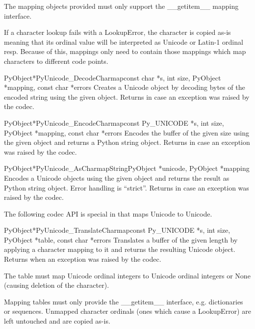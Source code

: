 \documentclass{manual}
\begin{document}
The mapping objects provided must only support the __getitem__ mapping
interface.

If a character lookup fails with a LookupError, the character is
copied as-is meaning that its ordinal value will be interpreted as
Unicode or Latin-1 ordinal resp. Because of this, mappings only need
to contain those mappings which map characters to different code
points.

\begin{cfuncdesc}{PyObject*}{PyUnicode_DecodeCharmap}{const char *s,
                                               int size,
                                               PyObject *mapping,
                                               const char *errors}
Creates a Unicode object by decoding  bytes of the encoded
string  using the given  object.  Returns \NULL{}
in case an exception was raised by the codec.
\end{cfuncdesc}

\begin{cfuncdesc}{PyObject*}{PyUnicode_EncodeCharmap}{const Py_UNICODE *s,
                                               int size,
                                               PyObject *mapping,
                                               const char *errors}
Encodes the  buffer of the given size using the
given  object and returns a Python string object.
Returns \NULL{} in case an exception was raised by the codec.
\end{cfuncdesc}

\begin{cfuncdesc}{PyObject*}{PyUnicode_AsCharmapString}{PyObject *unicode,
                                                        PyObject *mapping}
Encodes a Unicode objects using the given  object and
returns the result as Python string object. Error handling is
``strict''. Returns \NULL{} in case an exception was raised by the
codec.
\end{cfuncdesc}

The following codec API is special in that maps Unicode to Unicode.

\begin{cfuncdesc}{PyObject*}{PyUnicode_TranslateCharmap}{const Py_UNICODE *s,
                                               int size,
                                               PyObject *table,
                                               const char *errors}
Translates a  buffer of the given length by applying
a character mapping  to it and returns the resulting
Unicode object.  Returns \NULL{} when an exception was raised by the
codec.

The  table must map Unicode ordinal integers to Unicode
ordinal integers or None (causing deletion of the character).

Mapping tables must only provide the __getitem__ interface,
e.g. dictionaries or sequences. Unmapped character ordinals (ones
which cause a LookupError) are left untouched and are copied as-is.
\end{cfuncdesc}
\end{document}
